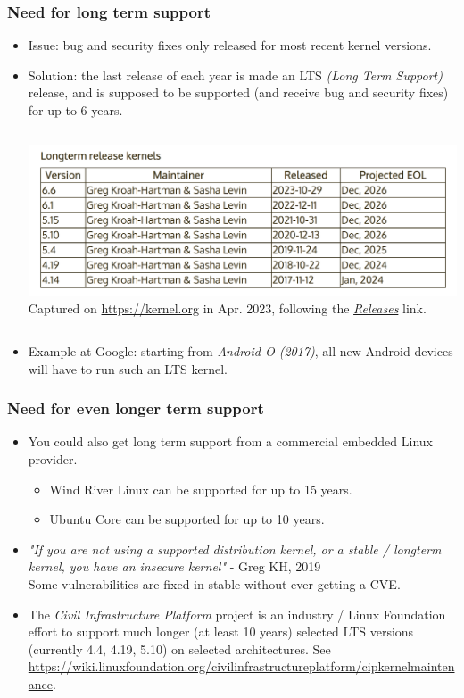 \begin{frame}[fragile]
  \frametitle{Need for long term support}
  \begin{itemize}
  \item Issue: bug and security fixes only released for most recent
    kernel versions.
  \item Solution: the last release of each year is made an LTS {\em (Long Term
     Support)} release, and is supposed to be supported (and receive bug
    and security fixes) for up to 6 years.
  \begin{columns}
  \includegraphics[width=\textwidth]{common/long-term-support-kernels.png}\\
  \scriptsize
   Captured on \url{https://kernel.org} in Apr. 2023, following the
   \href{https://www.kernel.org/category/releases.html}{\em Releases} link.
  \end{columns}
  \item Example at Google: starting from {\em Android O (2017)}, all new Android devices will
    have to run such an LTS kernel.
  \end{itemize}
\end{frame}

\begin{frame}[fragile]
  \frametitle{Need for even longer term support}
  \begin{itemize}
  \item You could also get long term support from a commercial embedded
    Linux provider.
    \begin{itemize}
	\item Wind River Linux can be supported for up to 15 years.
	\item Ubuntu Core can be supported for up to 10 years.
    \end{itemize}
  \item {\em "If you are not using a supported distribution kernel, or a stable / longterm
    kernel, you have an insecure kernel"} - Greg KH, 2019\\
    Some vulnerabilities are fixed in stable without ever getting a CVE.
  \item The {\em Civil Infrastructure Platform} project is an industry /
    Linux Foundation effort to support much longer (at least 10 years)
    selected LTS versions (currently 4.4, 4.19, 5.10) on selected architectures.
    See \url{https://wiki.linuxfoundation.org/civilinfrastructureplatform/cipkernelmaintenance}.
  \end{itemize}
\end{frame}

